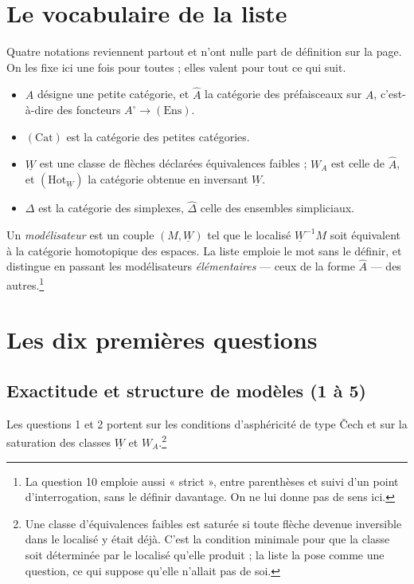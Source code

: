 \documentclass[11pt,a4paper]{article}
\begin{document}
\section*{Le vocabulaire de la liste}

Quatre notations reviennent partout et n'ont nulle part de définition sur la
page. On les fixe ici une fois pour toutes ; elles valent pour tout ce qui
suit.

\begin{itemize}
\item $A$ désigne une petite catégorie, et $\hat{A}$ la catégorie des
préfaisceaux sur $A$, c'est-à-dire des foncteurs $A^{\circ} \to
(\mathrm{Ens})$.
\item $(\mathrm{Cat})$ est la catégorie des petites catégories.
\item $\underline{W}$ est une classe de flèches déclarées équivalences faibles ;
$W_{A}$ est celle de $\hat{A}$, et $(\mathrm{Hot}_{\underline{W}})$ la
catégorie obtenue en inversant $\underline{W}$.
\item $\Delta$ est la catégorie des simplexes, $\hat{\Delta}$ celle des
ensembles simpliciaux.
\end{itemize}

Un \emph{modélisateur} est un couple $(M, \underline{W})$ tel que le localisé
$\underline{W}^{-1}M$ soit équivalent à la catégorie homotopique des espaces. La
liste emploie le mot sans le définir, et distingue en passant les modélisateurs
\emph{élémentaires} --- ceux de la forme $\hat{A}$ --- des autres.\footnote{La
question 10 emploie aussi « strict », entre parenthèses et suivi d'un point
d'interrogation, sans le définir davantage. On ne lui donne pas de sens ici.}

\section*{Les dix premières questions}

\subsection*{Exactitude et structure de modèles (1 à 5)}

Les questions 1 et 2 portent sur les conditions d'asphéricité de type Čech et
sur la saturation des classes $\underline{W}$ et $W_{A}$.\footnote{Une classe
d'équivalences faibles est saturée si toute flèche devenue inversible dans le
localisé y était déjà. C'est la condition minimale pour que la classe soit
déterminée par le localisé qu'elle produit ; la liste la pose comme une
question, ce qui suppose qu'elle n'allait pas de soi.}
\end{document}
